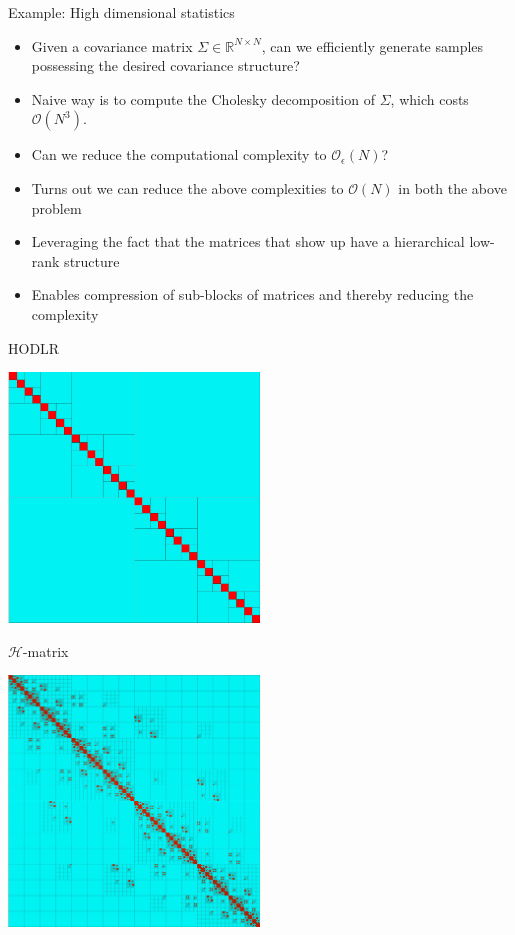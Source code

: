 \documentclass{beamer}
\newcommand{\Rb}{\mathbb{R}}
\begin{document}
\begin{frame}{Example: High dimensional statistics}
	\begin{itemize}
		\item
		Given a covariance matrix $\Sigma \in \Rb^{N \times N}$, can we efficiently generate samples possessing the desired covariance structure?
		\item
		Naive way is to compute the Cholesky decomposition of $\Sigma$, which costs $\mathcal{O}(N^3)$.
		\item
		Can we reduce the computational complexity to $\mathcal{O}_{\epsilon}(N)$?
	\end{itemize}
\end{frame}

\begin{frame}
	\begin{itemize}
		\item
		Turns out we can reduce the above complexities to $\mathcal{O}(N)$ in both the above problem
		\item
		Leveraging the fact that the matrices that show up have a hierarchical low-rank structure
		\item
		Enables compression of sub-blocks of matrices and thereby reducing the complexity
	\end{itemize}
\end{frame}

\begin{frame}{HODLR}
	\begin{center}
	\includegraphics[width=0.5\textwidth]{./images/HSS_level_5.jpg}
	\end{center}
\end{frame}

\begin{frame}{$\mathcal{H}$-matrix}
	\begin{center}
	\includegraphics[width=0.5\textwidth]{./images/H2D_level_4.jpg}
	\end{center}
\end{frame}
\end{document}
